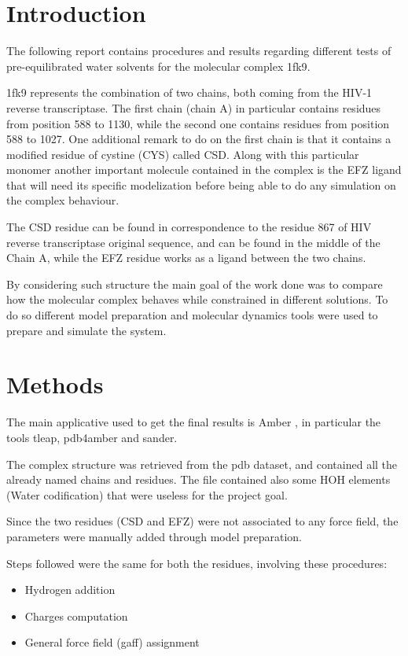 \documentclass[12pt]{article}
\begin{document}
\section{Introduction}
The following report contains procedures and results regarding different tests of pre-equilibrated water solvents for the molecular complex 1fk9\cite{Ren2000}.

1fk9 represents the combination of two chains, both coming from
the HIV-1 reverse transcriptase\cite{pmid3040055}.
The first chain (chain A) in particular contains residues from position
588 to 1130, while the second one contains residues from
position 588 to 1027. One additional remark to do on the first
chain is that it contains a modified residue of cystine (CYS)
called CSD. Along with this particular monomer another
important molecule contained in the complex is the EFZ ligand
that will need its specific modelization before being able to
do any simulation on the complex behaviour.

The CSD residue can be found in correspondence to the residue
867 of HIV reverse transcriptase original sequence, and can be
found in the middle of the Chain A, while the EFZ residue works
as a ligand between the two chains.

By considering such structure the main goal of the work done
was to compare how the molecular complex behaves while
constrained in different solutions. To do so different
model preparation and molecular dynamics tools were used to
prepare and simulate the system.
\section{Methods}
The main applicative used to get the final results is Amber \cite{Amber}, in particular the tools tleap, pdb4amber and sander.

The complex structure was retrieved from the pdb dataset, and contained all the already named chains and residues. The file contained also some HOH elements (Water codification) that were useless for the project goal.

Since the two residues (CSD and EFZ) were not associated to any force field, the parameters were manually added through model preparation.

Steps followed were the same for both the residues, involving these procedures:

\begin{itemize}
    \item Hydrogen addition
    \item Charges computation
    \item General force field (gaff) assignment
\end{itemize}
\end{document}
